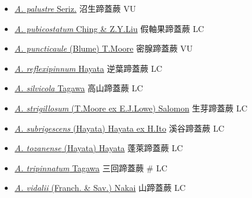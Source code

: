 \begin{itemize}
\begin{itemize}
        \item[] \href{http://www.theplantlist.org/tpl1.1/search?q=Athyrium+palustre}{\textit{A. palustre} Seriz.}   沼生蹄蓋蕨   VU
        \item[] \href{http://www.theplantlist.org/tpl1.1/search?q=Athyrium+pubicostatum}{\textit{A. pubicostatum} Ching \& Z.Y.Liu}   假軸果蹄蓋蕨   LC
        \item[] \href{http://www.theplantlist.org/tpl1.1/search?q=Athyrium+puncticaule}{\textit{A. puncticaule} (Blume) T.Moore}   密腺蹄蓋蕨   VU
        \item[] \href{http://www.theplantlist.org/tpl1.1/search?q=Athyrium+reflexipinnum}{\textit{A. reflexipinnum} Hayata}   逆葉蹄蓋蕨   LC
        \item[] \href{http://www.theplantlist.org/tpl1.1/search?q=Athyrium+silvicola}{\textit{A. silvicola} Tagawa}   高山蹄蓋蕨   LC
        \item[] \href{http://www.theplantlist.org/tpl1.1/search?q=Athyrium+strigillosum}{\textit{A. strigillosum} (T.Moore ex E.J.Lowe) Salomon}   生芽蹄蓋蕨   LC
        \item[] \href{http://www.theplantlist.org/tpl1.1/search?q=Athyrium+subrigescens}{\textit{A. subrigescens} (Hayata) Hayata ex H.Ito}   溪谷蹄蓋蕨   LC
        \item[] \href{http://www.theplantlist.org/tpl1.1/search?q=Athyrium+tozanense}{\textit{A. tozanense} (Hayata) Hayata}   蓬萊蹄蓋蕨   LC
        \item[] \href{http://www.theplantlist.org/tpl1.1/search?q=Athyrium+tripinnatum}{\textit{A. tripinnatum} Tagawa}   三回蹄蓋蕨  \# LC
        \item[] \href{http://www.theplantlist.org/tpl1.1/search?q=Athyrium+vidalii}{\textit{A. vidalii} (Franch. \& Sav.) Nakai}   山蹄蓋蕨   LC

\end{itemize}
\end{itemize}
